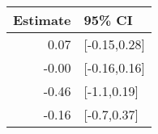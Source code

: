 \begin{tabular}{rl}
  \hline
Estimate & 95\% CI \\ 
  \hline
0.07 & [-0.15,0.28] \\ 
  -0.00 & [-0.16,0.16] \\ 
  -0.46 & [-1.1,0.19] \\ 
  -0.16 & [-0.7,0.37] \\ 
   \hline
\end{tabular}

